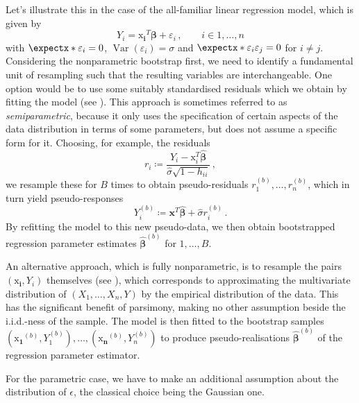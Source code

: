 \documentclass[a4paper]{book}
\begin{document}
Let's illustrate this in the case of the all-familiar linear regression model, which is given by
\begin{equation} \label{eq:linear-model}
  Y_i = \bm{\mathrm{x}_i}^T \bm{\beta} + \varepsilon_i \,, \qquad i \in {1, \dots, n}
\end{equation}
with $\expect{\varepsilon_i} = 0$, $\operatorname{Var}(\varepsilon_i) = \sigma$ and $\expect{\varepsilon_i \varepsilon_j} = 0$ for $i \neq j$. Considering the nonparametric bootstrap first, we need to identify a fundamental unit of resampling such that the resulting variables are interchangeable. One option would be to use some suitably standardised residuals which we obtain by fitting the model (see \cite[Algorithm 6.1]{davison}). This approach is sometimes referred to as \emph{semiparametric}, because it only uses the specification of certain aspects of the data distribution in terms of some parameters, but does not assume a specific form for it. Choosing, for example, the residuals
\begin{equation}
  r_i \coloneqq \frac{Y_i - \bm{\mathrm{x}}^T_i \widehat{\bm{\beta}}}{\widehat{\sigma} \sqrt{1 - h_{ii}}} \,,
\end{equation}
we resample these for $B$ times to obtain pseudo-residuals $r^{(b)}_1, \dots, r^{(b)}_n$, which in turn yield  pseudo-responses
\begin{equation}
  Y_i^{(b)} \coloneqq \mathbf{x}^T \widehat{\bm{\beta}} + \widehat{\sigma} r^{(b)}_i \,.
\end{equation}
By refitting the model to this new pseudo-data, we then obtain bootstrapped regression parameter estimates $\widehat{\bm{\beta}}^{(b)}$ for $1, \dots, B$.

An alternative approach, which is fully nonparametric, is to resample the pairs $(\bm{\mathrm{x}_i}, Y_i)$ themselves (see \cites[Section 9.5]{efron:intro}[Algorithm 6.2]{davison}), which corresponds to approximating the multivariate distribution of $(X_1, \dots, X_n, Y)$ by the empirical distribution of the data. This has the significant benefit of parsimony, making no other assumption beside the i.i.d.-ness of the sample. The model is then fitted to the bootstrap samples $(\bm{\mathrm{x}_1}^{(b)}, Y^{(b)}_1), \dots, (\bm{\mathrm{x}_n}^{(b)}, Y^{(b)}_n)$ to produce pseudo-realisations $\widehat{\bm{\beta}}^{(b)}$ of the regression parameter estimator.

For the parametric case, we have to make an additional assumption about the distribution of $\epsilon$, the classical choice being the Gaussian one. 
\end{document}
